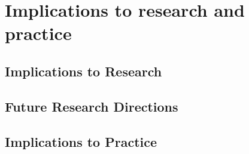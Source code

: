 \chapter{Implications to research and practice}
\label{chapter:Implications}

\section{Implications to Research}



\section{Future Research Directions}


\section{Implications to Practice}
